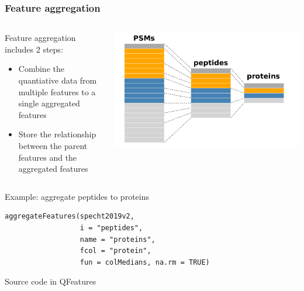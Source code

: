 \documentclass{beamer}
\newcommand{\hcode}[2][lgray]{{\ttfamily\color{vdgray}\colorbox{#1}{#2}}}
\newcommand{\frametitlesection}[1]{\frametitle{\centering #1 \footnotesize \hspace{0pt plus 1 filll} \insertsection}}
\begin{document}
\begin{frame}[fragile]
    \frametitlesection{Feature aggregation}
    
    \begin{columns}
        \begin{column}{0.6\textwidth}
            Feature aggregation includes 2 steps:
            \begin{itemize}
                \item{Combine the quantiative data from multiple features to a 
                single aggregated features}
                \item{Store the relationship between the parent features and the 
                aggregated features}
            \end{itemize}
        \end{column}
        \begin{column}{0.4\textwidth}
            \includegraphics[width=\textwidth]{figs/QFeatures.pdf}
        \end{column}
    \end{columns}
    
    \bigskip
    
    Example: aggregate peptides to proteins
    
    \begin{lstlisting}
aggregateFeatures(specht2019v2,
                  i = "peptides",
                  name = "proteins", 
                  fcol = "protein", 
                  fun = colMedians, na.rm = TRUE)
    \end{lstlisting}
    
    Source code in \hcode{QFeatures}
    
\end{frame}
\end{document}
